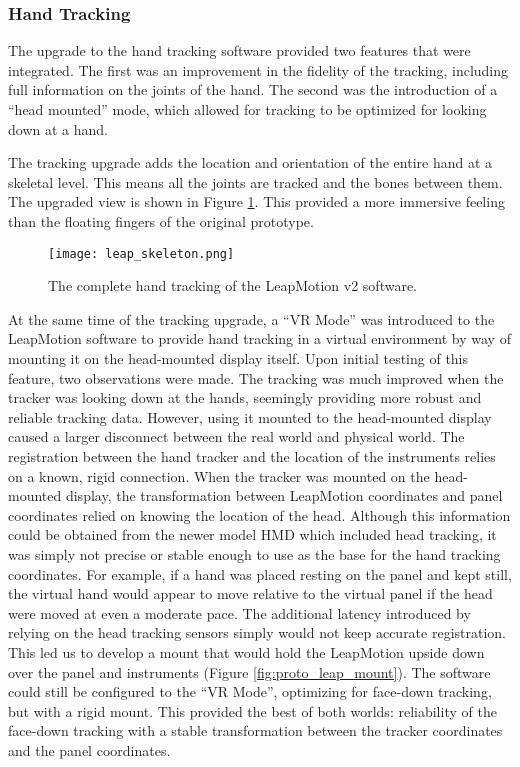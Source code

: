 \subsubsection{Hand Tracking}

The upgrade to the hand tracking software provided two features that were integrated.
The first was an improvement in the fidelity of the tracking, including full information on the joints of the hand.
The second was the introduction of a ``head mounted'' mode, which allowed for tracking to be optimized for looking down at a hand.

The tracking upgrade adds the location and orientation of the entire hand at a skeletal level.
This means all the joints are tracked and the bones between them.
The upgraded view is shown in Figure \ref{fig:proto_skeleton}.
This provided a more immersive feeling than the floating fingers of the original prototype.

\begin{figure}
    \centering
    \texttt{[image: leap\_skeleton.png]}
    \caption{The complete hand tracking of the LeapMotion v2 software.}
    \label{fig:proto_skeleton}
\end{figure}

At the same time of the tracking upgrade, a ``VR Mode'' was introduced to the LeapMotion software to provide hand tracking in a virtual environment by way of mounting it on the head-mounted display itself.
Upon initial testing of this feature, two observations were made.
The tracking was much improved when the tracker was looking down at the hands, seemingly providing more robust and reliable tracking data.
However, using it mounted to the head-mounted display caused a larger disconnect between the real world and physical world.
The registration between the hand tracker and the location of the instruments relies on a known, rigid connection.
When the tracker was mounted on the head-mounted display, the transformation between LeapMotion coordinates and panel coordinates relied on knowing the location of the head.
Although this information could be obtained from the newer model HMD which included head tracking, it was simply not precise or stable enough to use as the base for the hand tracking coordinates.
For example, if a hand was placed resting on the panel and kept still, the virtual hand would appear to move relative to the virtual panel if the head were moved at even a moderate pace.
The additional latency introduced by relying on the head tracking sensors simply would not keep accurate registration.
This led us to develop a mount that would hold the LeapMotion upside down over the panel and instruments (Figure \ref{fig:proto_leap_mount}).
The software could still be configured to the ``VR Mode'', optimizing for face-down tracking, but with a rigid mount.
This provided the best of both worlds: reliability of the face-down tracking with a stable transformation between the tracker coordinates and the panel coordinates.

